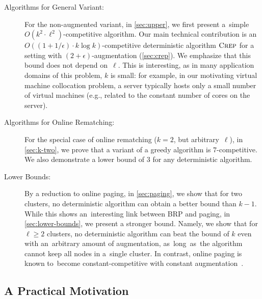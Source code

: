 \documentclass{siamart190516}
\newcommand{\CREP}{\textsc{Crep}\xspace}
\newcommand{\eps}{\ensuremath{\epsilon}}
\begin{document}
\begin{description}

\item[Algorithms for General Variant:]
For the non-augmented variant, in \cref{sec:upper}, we first present a~simple
$O(k^2 \cdot \ell^2)$-competitive algorithm. Our main technical contribution
is an $O((1+1/\eps) \cdot k \log{k})$-competitive deterministic algorithm
$\CREP$ for a setting with $(2+\eps)$-augmentation (\cref{sec:crep}).
We emphasize that this bound does not depend on~$\ell$. This is interesting,
as in many application domains of this problem, $k$ is small: for example, in
our motivating virtual machine collocation problem, a server typically hosts
only a small number of virtual machines (e.g., related to the constant number
of cores on the server).

\item[Algorithms for Online Rematching:]
For the special case of online rematching ($k=2$, but arbitrary~$\ell$), in
\cref{sec:k-two}, we prove that a variant of a greedy algorithm is
7-competitive. We also demonstrate a lower bound of 3 for any deterministic
algorithm.

\item[Lower Bounds:]
By a reduction to online paging, in \cref{sec:paging}, we show that
for two clusters, no deterministic algorithm can obtain a better bound than
$k-1$. While this shows an~interesting link between BRP and paging, in
\cref{sec:lower-bounds}, we present a stronger bound. Namely, we
show that for ${\ell \geq 2}$ clusters, no deterministic algorithm can beat the
bound of $k$ even with an~arbitrary amount of augmentation, as~long~as~the
algorithm cannot keep all nodes in a~single cluster. In contrast, online
paging is known to~become constant-competitive with constant
augmentation~\cite{SleTar85}.

\end{description}


\subsection{A Practical Motivation}
\end{document}
